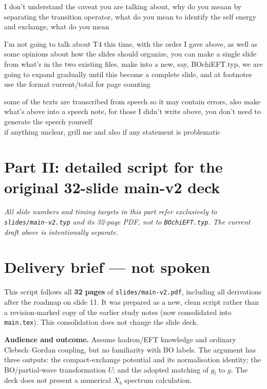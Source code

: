 \documentclass[11pt,a4paper]{article}
\newcommand{\draftcue}[1]{\begin{private}#1\end{private}}
\begin{document}
\draftcue{I don't understand the caveat you are talking about, why do you meaan by separating the transition operator, what do you mean to identify the self energy and exchange, what do you mean }

\draftcue{I'm not going to talk about T4 this time, with the order I gave above, as well as some opinions about how the slides should organize, you can make a single slide from what's in the two existing files, make into a new, say, BOchiEFT.typ, we are going to expand gradually until this become a complete slide, and at footnotes use the format current/total for page counting}

\draftcue{some of the texts are transcribed from speech so it may contain errors, also make what's above into a speech note, for those I didn't write above, you don't need to generate the speech yourself\\
	if anything unclear, grill me and also if any statement is problematic
}

\clearpage
{}\label{legacy-script}
\section*{Part II: detailed script for the original 32-slide main-v2 deck}
\textit{All slide numbers and timing targets in this part refer exclusively to
\texttt{slides/main-v2.typ} and its 32-page PDF, not to \texttt{BOchiEFT.typ}.
The current draft above is intentionally separate.}


\section*{Delivery brief --- not spoken}
This script follows all \textbf{32 pages} of \texttt{slides/main-v2.pdf}, including
all derivations after the roadmap on slide 11. It was prepared as a new, clean script rather than a revision-marked copy
of the earlier study notes (now consolidated into \texttt{main.tex}).
This consolidation does not change the slide deck.

\textbf{Audience and outcome.} Assume hadron/EFT knowledge and ordinary
Clebsch--Gordan coupling, but no familiarity with BO labels. The argument has
three outputs: the compact-exchange potential and its normalisation identity;
the BO/partial-wave transformation $U$; and the adopted matching of $g_l$ to $g$.
The deck does not present a numerical $X_b$ spectrum calculation.
\end{document}
